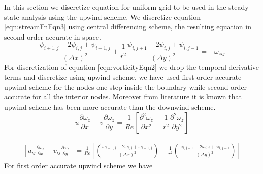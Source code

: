 \documentclass{article}
\begin{document}
In this section we discretize equation for uniform grid to be used in the steady state analysis using the upwind scheme. We discretize equation \ref{eqn:streamFnEqn3} using central differencing scheme, the resulting equation in second order accurate in space.
\begin{equation}
\frac{\psi_{i+1,j}-2\psi_{i,j}+\psi_{i-1,j} }{(\Delta x)^2} + \frac{1}{r^2}\frac{\psi_{i,j+1}-2\psi_{i,j}+\psi_{i,j-1}}{(\Delta y)^2} = -\omega_{zij}
\end{equation}
For discretization of equation \ref{eqn:vorticityEqn2} we drop the temporal derivative terms and discretize using upwind scheme, we have used first order accurate upwind scheme for the nodes one step inside the boundary while second order accurate for all the interior nodes. Moreover from literature it is known that upwind scheme has been more accurate than the downwind scheme. \citep{agarwal}
\begin{equation}
u\frac{\partial \omega_z}{\partial x} + v\frac{\partial \omega_z}{\partial y}= \frac{1}{Re} \left [ \frac{\partial^2 \omega_z}{\partial x^2} +  \frac{1}{r^2}\frac{\partial^2 \omega_z}{\partial y^2} \right ]
\end{equation}

\begin{equation} 
\begin{split}
\left[u_{ij}\frac{\partial \omega_z}{\partial x} + v_{ij}\frac{\partial \omega_z}{\partial y}  \right]
  = \frac{1}{Re}\left[\left(\frac{\omega_{i+1,j}-2\omega_{i,j}+\omega_{i-1,j}}{(\Delta x)^2}\right)+\frac{1}{r^2}\left(\frac{\omega_{i,j+1}-2\omega_{i,j}+\omega_{i,j-1}}{(\Delta y)^2}\right) \right]
\end{split}
\end{equation}
For first order accurate upwind scheme we have
\end{document}
